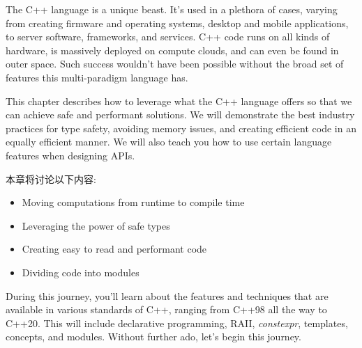 
The C++ language is a unique beast. It's used in a plethora of cases, varying from creating firmware and operating systems, desktop and mobile applications, to server software, frameworks, and services. C++ code runs on all kinds of hardware, is massively deployed on compute clouds, and can even be found in outer space. Such success wouldn't have been possible without the broad set of features this multi-paradigm language has.

This chapter describes how to leverage what the C++ language offers so that we can achieve safe and performant solutions. We will demonstrate the best industry practices for type safety, avoiding memory issues, and creating efficient code in an equally efficient manner. We will also teach you how to use certain language features when designing APIs.


本章将讨论以下内容:

\begin{itemize}
\item Moving computations from runtime to compile time
\item Leveraging the power of safe types
\item Creating easy to read and performant code
\item Dividing code into modules

\end{itemize}

During this journey, you'll learn about the features and techniques that are available in various standards of C++, ranging from C++98 all the way to C++20. This will include declarative programming, RAII, \textit{constexpr}, templates, concepts, and modules. Without further ado, let's begin this journey.






